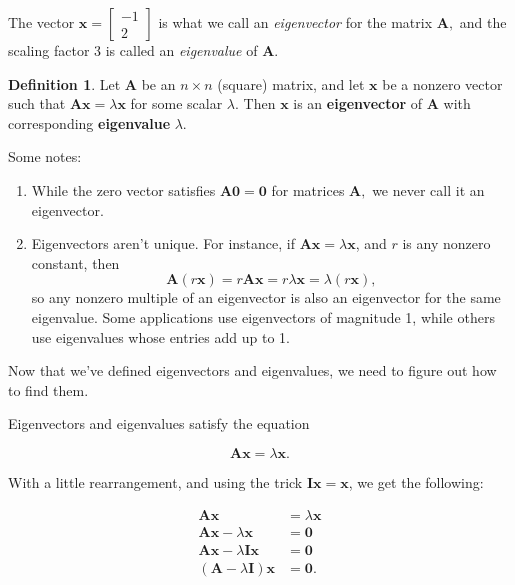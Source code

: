 \documentclass[
]{book}
\theoremstyle{definition}
\newtheorem{definition}{Definition}[chapter]
\theoremstyle{definition}
\theoremstyle{definition}
\theoremstyle{definition}
\theoremstyle{remark}
\begin{document}
The vector \(\mathbf{x}=\begin{bmatrix}-1\\2\end{bmatrix}\) is what we call an \emph{eigenvector} for the matrix \(\mathbf{A},\) and the scaling factor 3 is called an \emph{eigenvalue} of \(\mathbf{A}.\)

\begin{defbox}

\begin{definition}
Let \(\mathbf{A}\) be an \(n\times n\) (square) matrix, and let \(\mathbf{x}\) be a nonzero vector such that \(\mathbf{A}\mathbf{x}=\lambda \mathbf{x}\) for some scalar \(\lambda\). Then \(\mathbf{x}\) is an \textbf{eigenvector} of \(\mathbf{A}\) with corresponding \textbf{eigenvalue} \(\lambda\).
\end{definition}

\end{defbox}

Some notes:

\begin{enumerate}
\def\labelenumi{\arabic{enumi}.}
\item
  While the zero vector satisfies \(\mathbf{A0}=\mathbf{0}\) for matrices \(\mathbf{A},\) we never call it an eigenvector.
\item
  Eigenvectors aren't unique. For instance, if \(\mathbf{A}\mathbf{x}=\lambda \mathbf{x}\), and \(r\) is any nonzero constant, then
  \[\mathbf{A}(r\mathbf{x})=r\mathbf{A}\mathbf{x}=r\lambda \mathbf{x}=\lambda(r\mathbf{x}),\]
  so any nonzero multiple of an eigenvector is also an eigenvector for the same eigenvalue. Some applications use eigenvectors of magnitude 1, while others use eigenvalues whose entries add up to 1.
\end{enumerate}

Now that we've defined eigenvectors and eigenvalues, we need to figure out how to find them.

Eigenvectors and eigenvalues satisfy the equation

\[\mathbf{A}\mathbf{x}=\lambda\mathbf{x}.\]

With a little rearrangement, and using the trick \(\mathbf{I}\mathbf{x}=\mathbf{x}\), we get the following:

\begin{align*}
    \mathbf{A}\mathbf{x}&=\lambda \mathbf{x}\\
    \mathbf{A}\mathbf{x}-\lambda\mathbf{x}&=\mathbf{0}\\
    \mathbf{A}\mathbf{x}-\lambda \mathbf{I}\mathbf{x}&=\mathbf{0}\\
    (\mathbf{A}-\lambda \mathbf{I})\mathbf{x}&=\mathbf{0}.
\end{align*}
\end{document}

